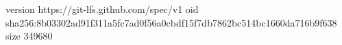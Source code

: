 version https://git-lfs.github.com/spec/v1
oid sha256:8b03302ad91f311a5fc7ad0f56a0cbdf15f7db7862bc514bc1660da716b9f638
size 349680
